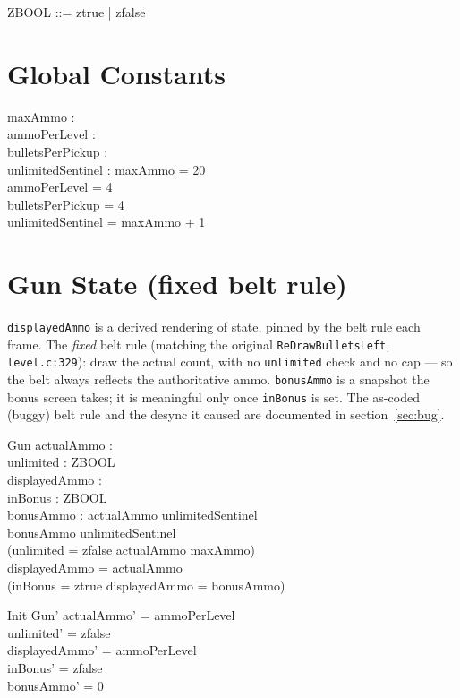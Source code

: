 \documentclass[a4paper,10pt,fleqn]{article}
\begin{document}
\begin{zed}
ZBOOL ::= ztrue | zfalse
\end{zed}

\section{Global Constants}

\begin{axdef}
maxAmmo : \nat \\
ammoPerLevel : \nat \\
bulletsPerPickup : \nat \\
unlimitedSentinel : \nat
\where
maxAmmo = 20 \\
ammoPerLevel = 4 \\
bulletsPerPickup = 4 \\
unlimitedSentinel = maxAmmo + 1
\end{axdef}

\section{Gun State (fixed belt rule)}

\texttt{displayedAmmo} is a derived rendering of state, pinned by the
belt rule each frame.  The \emph{fixed} belt rule (matching the original
\texttt{ReDrawBulletsLeft}, \texttt{level.c:329}): draw the actual count,
with no \texttt{unlimited} check and no cap --- so the belt always
reflects the authoritative ammo.  \texttt{bonusAmmo} is a snapshot the
bonus screen takes; it is meaningful only once \texttt{inBonus} is set.
The as-coded (buggy) belt rule and the desync it caused are documented
in section~\ref{sec:bug}.

\begin{schema}{Gun}
actualAmmo : \nat \\
unlimited : ZBOOL \\
displayedAmmo : \nat \\
inBonus : ZBOOL \\
bonusAmmo : \nat
\where
actualAmmo \leq unlimitedSentinel \\
bonusAmmo \leq unlimitedSentinel \\
(unlimited = zfalse \implies actualAmmo \leq maxAmmo) \\
displayedAmmo = actualAmmo \\
(inBonus = ztrue \implies displayedAmmo = bonusAmmo)
\end{schema}

\begin{schema}{Init}
Gun'
\where
actualAmmo' = ammoPerLevel \\
unlimited' = zfalse \\
displayedAmmo' = ammoPerLevel \\
inBonus' = zfalse \\
bonusAmmo' = 0
\end{schema}
\end{document}
